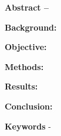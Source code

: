 \textbf{Abstract --}

\noindent\textbf{Background:} 

\noindent\textbf{Objective:} 

\noindent\textbf{Methods:} 

\noindent\textbf{Results:}

\noindent\textbf{Conclusion:} 
    
    \smallskip
    \smallskip
    
\noindent\textbf{Keywords} -  
